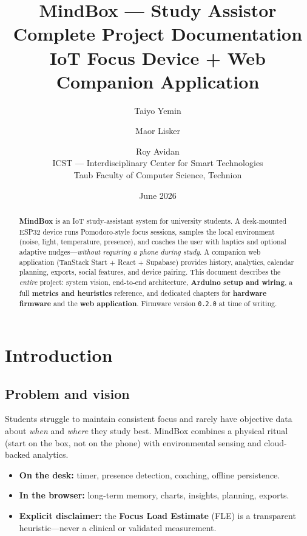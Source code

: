 \documentclass[11pt,a4paper]{report}
\title{%
  \textbf{MindBox --- Study Assistor}\\[0.6em]
  \large Complete Project Documentation\\[0.3em]
  \normalsize IoT Focus Device + Web Companion Application}
\author{Taiyo Yemin \and Maor Lisker \and Roy Avidan\\[0.4em]
\small ICST --- Interdisciplinary Center for Smart Technologies\\
Taub Faculty of Computer Science, Technion}
\date{June 2026}
\newcommand{\filepath}[1]{\texttt{#1}}
\newcommand{\keyword}[1]{\textbf{\textcolor{keyword}{#1}}}
\begin{document}
\maketitle

\begin{abstract}
\textbf{MindBox} is an IoT study-assistant system for university students. A desk-mounted
ESP32 device runs Pomodoro-style focus sessions, samples the local environment (noise,
light, temperature, presence), and coaches the user with haptics and optional adaptive
nudges---\emph{without requiring a phone during study}. A companion web application
(TanStack Start + React + Supabase) provides history, analytics, calendar planning,
exports, social features, and device pairing. This document describes the \emph{entire}
project: system vision, end-to-end architecture, \textbf{Arduino setup and wiring},
a full \textbf{metrics and heuristics} reference, and dedicated chapters for
\textbf{hardware firmware} and the \textbf{web application}. Firmware version
\filepath{0.2.0} at time of writing.
\end{abstract}

\tableofcontents
\listoffigures
\newpage

\chapter{Introduction}

\section{Problem and vision}

Students struggle to maintain consistent focus and rarely have objective data about
\emph{when} and \emph{where} they study best. MindBox combines a physical ritual (start
on the box, not on the phone) with environmental sensing and cloud-backed analytics.

\begin{itemize}[leftmargin=*]
  \item \textbf{On the desk:} timer, presence detection, coaching, offline persistence.
  \item \textbf{In the browser:} long-term memory, charts, insights, planning, exports.
  \item \textbf{Explicit disclaimer:} the \keyword{Focus Load Estimate} (FLE) is a
        transparent heuristic---never a clinical or validated measurement.
\end{itemize}
\end{document}
